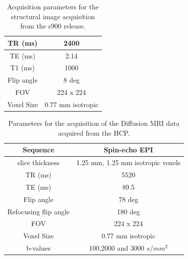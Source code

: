 \documentclass[msthesis.tex]{subfiles}
\begin{document}
\begin{table}[]
    
\begin{tcolorbox}

    \centering
    \begin{tabular}{|c|c|}
    \hline
         TR (ms) & 2400\\
    \hline
         TE (ms) & 2.14 \\
    \hline
         T1 (ms) & 1000 \\
    \hline
         Flip angle & 8 deg \\
    \hline
         FOV & 224 x 224 \\
    \hline
         Voxel Size & 0.77 mm isotropic \\
    \hline
    \end{tabular}
    \caption{Acquisition parameters for the structural image acquisition from the s900 release. }
    \label{tab:structuralmri}
\end{tcolorbox}

\end{table}

\begin{table}[]

\begin{tcolorbox}
\centering
    \begin{tabular}{|c|c|}
          \hline
         Sequence &  Spin-echo EPI \\
          \hline
         slice thickness & 1.25 mm, 1.25 mm isotropic voxels\\
          \hline
         TR (ms) & 5520  \\
          \hline
         TE (ms) & 89.5 \\
          \hline
         Flip angle & 78 deg \\
          \hline
         Refocusing flip angle & 180 deg \\
          \hline
         FOV & 224 x 224 \\
          \hline
        Voxel Size & 0.77 mm isotropic \\
         \hline
        b-values & 100,2000 and 3000 $s/mm^2$\\
         \hline
    \end{tabular}
    \caption{Parameters for the acquisition of the Diffusion MRI data acquired from the HCP.}
    \label{tab:diffusionmripara}
\end{tcolorbox}

\end{table}
\end{document}
